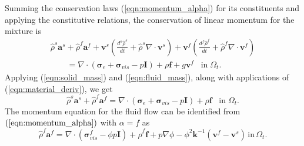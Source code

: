Summing the conservation laws (\ref{eqn:momentum_alpha}) for its constituents and applying the constitutive relations, the conservation of linear momentum for the mixture is
\begin{multline}
\hat\rho^{s}\boldsymbol{a}^{s}+\hat\rho^{f}\boldsymbol{a}^{f}+  \boldsymbol{v}^{s}\left(  \frac{d^{s}\hat{\rho}^{s}  }{dt}  + \hat{\rho}^{s}  \nabla \cdot \boldsymbol{v}^{s} \right) +  \boldsymbol{v}^{f}\left(  \frac{d^{f}\hat{\rho}^{f}  }{dt}  + \hat{\rho}^{f} \nabla \cdot \boldsymbol{v}^{f} \right) \\
\qquad =\nabla \cdot( \boldsymbol{\sigma}_{e}+\boldsymbol{\sigma}_{vis}-p\boldsymbol{I}) + \rho\boldsymbol{f} + g\boldsymbol{v}^{f} \;\;\; \mbox{in} \; \Omega_{t}.
\end{multline}
Applying (\ref{eqn:solid_mass}) and (\ref{eqn:fluid_mass}), along with applications of (\ref{eqn:material_deriv}), we get
\begin{equation}
\hat\rho^{s}\boldsymbol{a}^{s}+\hat\rho^{f}\boldsymbol{a}^{f} =\nabla \cdot( \boldsymbol{\sigma}_{e}+\boldsymbol{\sigma}_{vis}-p\boldsymbol{I}) + \rho\boldsymbol{f} \;\;\; \mbox{in} \; \Omega_{t}.
\label{mixture_motion_eulerian}
\end{equation}
The momentum equation for the fluid flow can be identified from $(\ref{eqn:momentum_alpha})$ with $\alpha=f$ as
\begin{equation}
\hat\rho^{f} {\boldsymbol{a}}^{f}  =\nabla \cdot( \boldsymbol{\sigma}_{vis}^{f}- \phi p \boldsymbol{I})  + \hat \rho^{f}\boldsymbol{f}  + p \nabla \phi-\phi^{2} \boldsymbol{k}^{-1}(\boldsymbol{v}^{f}-\boldsymbol{v}^{s}) \, \mbox{in} \, \Omega_{t}.
\label{general_darcy}
\end{equation}
 




